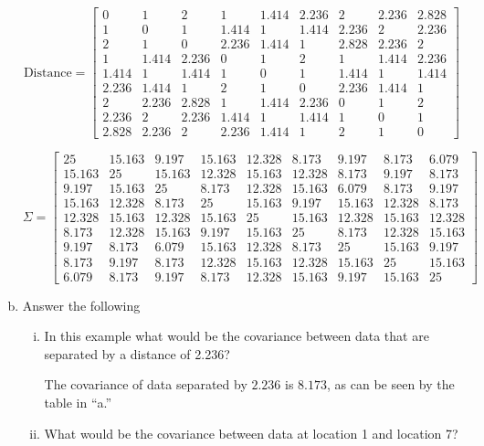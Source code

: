 \documentclass[letterpaper, 12pt]{article}\usepackage[]{graphicx}\usepackage[]{color}
\begin{document}
\begin{enumerate}[a.]
\[
\text{Distance} = \begin{bmatrix}
 0 & 1 & 2 & 1 & 1.414 & 2.236 & 2 & 2.236 & 2.828 \\
 1 & 0 & 1 & 1.414 & 1 & 1.414 & 2.236 & 2 & 2.236 \\
 2 & 1 & 0 & 2.236 & 1.414 & 1 & 2.828 & 2.236 & 2 \\
 1 & 1.414 & 2.236 & 0 & 1 & 2 & 1 & 1.414 & 2.236 \\
 1.414 & 1 & 1.414 & 1 & 0 & 1 & 1.414 & 1 & 1.414 \\
 2.236 & 1.414 & 1 & 2 & 1 & 0 & 2.236 & 1.414 & 1 \\
 2 & 2.236 & 2.828 & 1 & 1.414 & 2.236 & 0 & 1 & 2 \\
 2.236 & 2 & 2.236 & 1.414 & 1 & 1.414 & 1 & 0 & 1 \\
 2.828 & 2.236 & 2 & 2.236 & 1.414 & 1 & 2 & 1 & 0\end{bmatrix}\]



\[
\Sigma = \begin{bmatrix}
 25 & 15.163 & 9.197 & 15.163 & 12.328 & 8.173 & 9.197 & 8.173 & 6.079 \\
 15.163 & 25 & 15.163 & 12.328 & 15.163 & 12.328 & 8.173 & 9.197 & 8.173 \\
 9.197 & 15.163 & 25 & 8.173 & 12.328 & 15.163 & 6.079 & 8.173 & 9.197 \\
 15.163 & 12.328 & 8.173 & 25 & 15.163 & 9.197 & 15.163 & 12.328 & 8.173 \\
 12.328 & 15.163 & 12.328 & 15.163 & 25 & 15.163 & 12.328 & 15.163 & 12.328 \\
 8.173 & 12.328 & 15.163 & 9.197 & 15.163 & 25 & 8.173 & 12.328 & 15.163 \\
 9.197 & 8.173 & 6.079 & 15.163 & 12.328 & 8.173 & 25 & 15.163 & 9.197 \\
 8.173 & 9.197 & 8.173 & 12.328 & 15.163 & 12.328 & 15.163 & 25 & 15.163 \\
 6.079 & 8.173 & 9.197 & 8.173 & 12.328 & 15.163 & 9.197 & 15.163 & 25\end{bmatrix}\]




\item
Answer the following
\begin{enumerate}[(i)]
\item
In this example what would be the covariance between data that are separated by a distance of 2.236?

\textsf{The covariance of data separated by $2.236$ is $8.173$, as can be seen by the table in ``a.''}
\item
What would be the covariance between data at location 1 and location 7?


\end{enumerate}
\end{enumerate}
\end{document}

